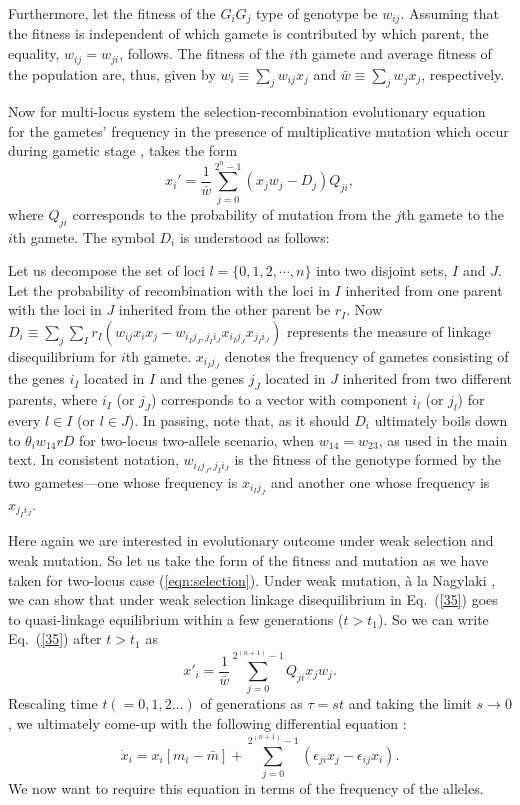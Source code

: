 \documentclass[
 pre,
 aps,
 a4paper,
 english,
 showkeys,
 reprint,
 twocolumn,
 superscriptaddress
]{revtex4}
\begin{document}
Furthermore, let the fitness of the $G_iG_j$ type of genotype be $w_{ij}$. Assuming that the fitness is independent of which gamete is contributed by which parent, the equality, $w_{ij}=w_{ji}$, follows. The fitness of the $i$th gamete and average fitness of the population are, thus, given by $w_i\equiv\sum_jw_{ij}x_j$ and $\bar w\equiv\sum_j w_jx_j$, respectively.

Now for multi-locus system the selection-recombination evolutionary equation~\cite{nagylaki1999JMB,nagylaki1993Genetics} for the gametes' frequency in the presence of multiplicative mutation which occur during gametic stage \cite{Ewing1981genetics}, takes the form
\begin{equation}
\label{35}
x_i'=\frac{1}{\bar{w}}\sum_{j=0}^{2^n-1}(x_jw_j-D_j)Q_{ji},
\end{equation}
where $Q_{ji}$ corresponds to the probability of mutation from the $j$th gamete to the $i$th gamete. The symbol $D_i$ is understood as follows:

Let us decompose the set of loci $l=\{0,1,2,\cdots,n\}$ into two disjoint sets, $I$ and $J$. Let the probability of recombination with the loci in $I$ inherited from one parent with the loci in $J$ inherited from the other parent be $r_I$.  Now $D_i\equiv\sum_{j}\sum_I r_I(w_{ij}x_i x_j-w_{i_I j_J, j_I i_J}x_{i_Ij_J}x_{j_I i_J})$ represents the measure of linkage disequilibrium for $i$th gamete. $x_{i_Ij_J}$ denotes the frequency of gametes consisting of the genes $i_I$ located in $I$ and the genes $j_J$ located in $J$ inherited from two different parents, where $i_I$ (or $j_J$) corresponds to a vector with component $i_l$ (or $j_l$) for every $l \in I$ (or $l \in J$). In passing, note that, as it should $D_i$  ultimately boils down to $\theta_i w_{14}r D$ for two-locus two-allele scenario, when $w_{14}=w_{23}$, as used in the main text. In consistent notation, $w_{i_I j_J, j_I i_J}$  is the fitness of the genotype formed by the two gametes---one whose frequency is $x_{i_Ij_J}$ and another one whose frequency is $x_{j_Ii_J}$.


Here again we are interested in evolutionary outcome under weak selection and weak mutation. So let us take the form of the fitness and mutation as we have taken for two-locus case (\ref{eqn:selection}).
Under weak mutation, \`a la Nagylaki \cite{nagylaki1993Genetics}, we can show that under weak selection linkage disequilibrium in Eq.~(\ref{35}) goes to quasi-linkage equilibrium within a few generations ($t>t_1$). So we can write Eq.~(\ref{35}) after $t>t_1$ as
\begin{equation}
x'_i=\frac{1}{\bar{w}}\sum_{j=0}^{2^{(n+1)}-1}Q_{ji}x_jw_j.
\end{equation}
Rescaling time $t(= 0, 1, 2...)$ of
generations as $\tau = st$ and taking the limit $s \to 0$, we ultimately come-up with the following differential equation {\cite{hofbauer1998book}}:
\begin{equation}\label{40}
\dot{x}_i=x_i\left[m_i-\bar{m}\right] +\sum_{j=0}^{2^{(n+1)}-1}(\epsilon_{ji}x_j-\epsilon_{ij}x_i).
\end{equation}
We now want to require this equation in terms of the frequency of the alleles.
\end{document}
